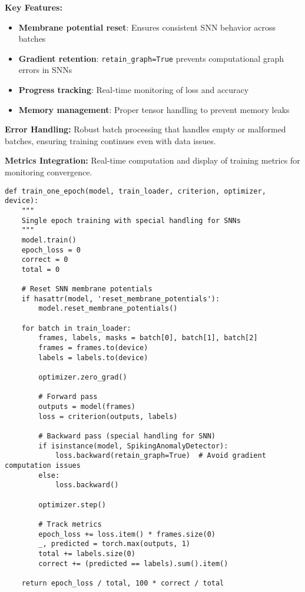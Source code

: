\documentclass[12pt,a4paper]{article}
\begin{document}
\textbf{Key Features:}
\begin{itemize}
    \item \textbf{Membrane potential reset}: Ensures consistent SNN behavior across batches
    \item \textbf{Gradient retention}: \texttt{retain\_graph=True} prevents computational graph errors in SNNs
    \item \textbf{Progress tracking}: Real-time monitoring of loss and accuracy
    \item \textbf{Memory management}: Proper tensor handling to prevent memory leaks
\end{itemize}

\textbf{Error Handling:} Robust batch processing that handles empty or malformed batches, ensuring training continues even with data issues.

\textbf{Metrics Integration:} Real-time computation and display of training metrics for monitoring convergence.

\begin{lstlisting}[caption={Training Loop with SNN Support - Robust Multi-Architecture Training}]
def train_one_epoch(model, train_loader, criterion, optimizer, device):
    """
    Single epoch training with special handling for SNNs
    """
    model.train()
    epoch_loss = 0
    correct = 0
    total = 0

    # Reset SNN membrane potentials
    if hasattr(model, 'reset_membrane_potentials'):
        model.reset_membrane_potentials()

    for batch in train_loader:
        frames, labels, masks = batch[0], batch[1], batch[2]
        frames = frames.to(device)
        labels = labels.to(device)

        optimizer.zero_grad()

        # Forward pass
        outputs = model(frames)
        loss = criterion(outputs, labels)

        # Backward pass (special handling for SNN)
        if isinstance(model, SpikingAnomalyDetector):
            loss.backward(retain_graph=True)  # Avoid gradient computation issues
        else:
            loss.backward()

        optimizer.step()

        # Track metrics
        epoch_loss += loss.item() * frames.size(0)
        _, predicted = torch.max(outputs, 1)
        total += labels.size(0)
        correct += (predicted == labels).sum().item()

    return epoch_loss / total, 100 * correct / total
\end{lstlisting}
\end{document}
